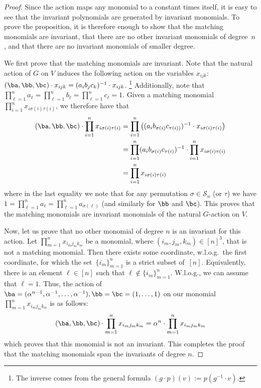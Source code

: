 \begin{proof}
  Since the action maps any monomial to a constant times itself, it is easy to see that the invariant polynomials are generated by invariant monomials.
	To prove the proposition, it is therefore enough to show that the matching monomials are invariant, that there are no other invariant monomials of degree~$n$, and that there are no invariant monomials of smaller degree.

  We first prove that the matching monomials are invariant.
	Note that the natural action of $G$ on $V$ induces the following action on the variables $x_{ijk}$:
	$(\ba, \bb, \bc) \cdot x_{ijk} = (a_i b_j c_k)^{-1} \cdot x_{ijk}$.
  \footnote{The inverse comes from the general formula $(g\cdot p)(v) := p(g^{-1} \cdot v)$. }
  Additionally, note that
	$\prod_{\ell=1}^n a_\ell = \prod_{\ell=1}^n b_\ell = \prod_{\ell=1}^n c_\ell = 1$. Given a
	matching monomial $\prod_{i =1}^n x_{i \sigma(i) \tau(i)}$, we therefore have that
	\begin{align*}
		(\ba, \bb, \bc) \cdot \prod_{i =1}^n x_{i \sigma(i) \tau(i)}
		& = \prod_{i =1}^n \left( (a_i b_{\sigma(i)} c_{\tau(i))})^{-1} \cdot x_{i \sigma(i) \tau(i)}  \right) \\
		& = \prod_{i=1}^n (a_i b_{\sigma(i)} c_{\tau(i)})^{-1}  \cdot
		\prod_{i =1}^n x_{i \sigma(i) \tau(i)} \\
		& = \prod_{i =1}^n x_{i \sigma(i) \tau(i)}
	\end{align*}
%
	where in the last equality we note that for any permutation $\sigma \in \mathcal{S}_n$ (or $\tau$)
	we have $1= \prod_{\ell=1}^n a_\ell = \prod_{\ell=1}^n a_{\sigma(\ell)}$ (and similarly for
	$\bb$ and $\bc$). This proves that the matching monomials are invariant monomials of the natural
	$G$-action on $V$.

	Now, let us prove that no other monomial of degree $n$ is an invariant for this action.
	Let $\prod_{m=1}^n x_{i_m j_m k_m}$ be a monomial, where $(i_m, j_m, k_m) \in [n]^3$, that is not a matching monomial.
	Then there exists some coordinate, w.l.o.g.\ the first coordinate, for which the set~$\{i_m\}_{m=1}^n$ is a strict subset of~$[n]$.
  Equivalently, there is an element $\ell \in [n]$ such that $\ell \not\in \{i_m\}_{m=1}^n$.
  W.l.o.g., we can assume that
	$\ell = 1$. Thus, the action of $\ba = (\alpha^{n-1}, \alpha^{-1}, \ldots, \alpha^{-1}),
	\bb = \bc = (1, \ldots, 1)$  on our monomial $\prod_{m=1}^n x_{i_m j_m k_m}$ is as follows:
	\begin{equation*}
		(\ba, \bb, \bc) \cdot \prod_{m=1}^n x_{i_m j_m k_m}
		= \alpha^n \cdot \prod_{m=1}^n x_{i_m j_m k_m}
	\end{equation*}
	which proves that this monomial is not an invariant.
  This completes the proof that the matching
	monomials span the invariants of degree $n$.


\end{proof}
